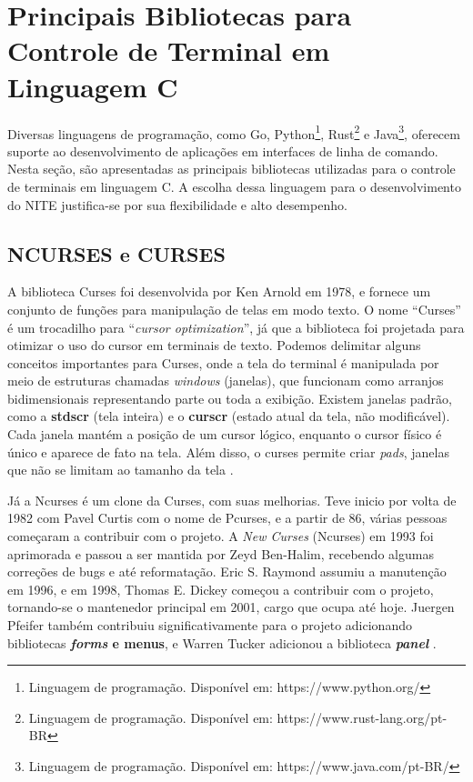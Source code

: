 \section{Principais Bibliotecas para Controle de Terminal em Linguagem C}

Diversas linguagens de programação, como Go, Python\footnote{Linguagem de
programação. Disponível em: https://www.python.org/}, Rust\footnote{Linguagem de
programação. Disponível em: https://www.rust-lang.org/pt-BR} e Java\footnote{Linguagem
de programação. Disponível em: https://www.java.com/pt-BR/}, oferecem suporte ao
desenvolvimento de aplicações em interfaces de linha de comando. Nesta seção, são
apresentadas as principais bibliotecas utilizadas para o controle de terminais em
linguagem C. A escolha dessa linguagem para o desenvolvimento do NITE justifica-se
por sua flexibilidade e alto desempenho.

\subsection{NCURSES e CURSES}

A biblioteca Curses foi desenvolvida por Ken Arnold em 1978, e fornece um
conjunto de funções para manipulação de telas em modo texto. O nome ``Curses'' é um
trocadilho para ``\textit{cursor optimization}'', já que a biblioteca foi projetada
para otimizar o uso do cursor em terminais de texto. Podemos delimitar alguns
conceitos importantes para Curses, onde a tela do terminal é manipulada por meio
de estruturas chamadas \textit{windows} (janelas), que funcionam como arranjos bidimensionais
representando parte ou toda a exibição. Existem janelas padrão, como a \textbf{stdscr}
(tela inteira) e o \textbf{curscr} (estado atual da tela, não modificável). Cada
janela mantém a posição de um cursor lógico, enquanto o cursor físico é único e
aparece de fato na tela. Além disso, o curses permite criar \textit{pads},
janelas que não se limitam ao tamanho da tela \cite{ibm_curses_aix}.

Já a Ncurses é um clone da Curses, com suas melhorias. Teve inicio por volta de
1982 com Pavel Curtis com o nome de Pcurses, e a partir de 86, várias pessoas
começaram a contribuir com o projeto. A \textit{New Curses} (Ncurses) em 1993
foi aprimorada e passou a ser mantida por Zeyd Ben-Halim, recebendo algumas correções
de bugs e até reformatação. Eric S. Raymond assumiu a manutenção em 1996, e em
1998, Thomas E. Dickey começou a contribuir com o projeto, tornando-se o mantenedor
principal em 2001, cargo que ocupa até hoje. Juergen Pfeifer também contribuiu significativamente
para o projeto adicionando bibliotecas \textbf{\textit{forms} e menus}, e Warren
Tucker adicionou a biblioteca \textbf{\textit{panel}} \cite{ncurses_site}.

